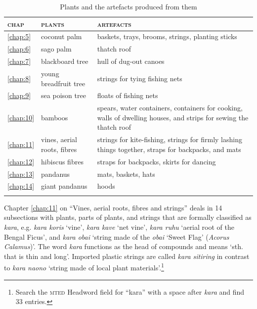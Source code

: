 \documentclass[output=paper]{langscibook}
\begin{document}
\begin{table}[t!]
    \caption{Plants and the artefacts produced from them}\label{tab:plantsandartefacts}
 \begin{tabularx}
{\textwidth}{llQ}

    \lsptoprule
        \textsc{chap}&\textsc{plants}&\textsc{artefacts}\\
    \midrule
        \ref{chap:5}&coconut palm&baskets, trays, brooms, strings, planting sticks\\
        \ref{chap:6}&sago palm&thatch roof\\
        \ref{chap:7}&blackboard tree&hull of dug-out canoes\\
        \ref{chap:8}&young breadfruit tree&strings for tying fishing nets\\
        \ref{chap:9}&sea poison tree&floats of fishing nets\\
        \ref{chap:10}&bamboos&spears, water containers, containers for cooking, walls of dwelling houses, and strips for sewing the thatch roof\\
        \ref{chap:11}&vines, aerial roots, fibres&strings for kite-fishing, strings for firmly lashing things together,  straps for backpacks, and mats\\
        \ref{chap:12}&hibiscus fibres&straps for backpacks, skirts for dancing\\
        \ref{chap:13}&pandanus&mats, baskets, hats\\
        \ref{chap:14}&giant pandanus&hoods\\
    \lspbottomrule
    \end{tabularx}
    \end{table}


Chapter \ref{chap:11} on ``Vines, aerial roots, fibres and strings'' deals in 14 subsections with plants, parts of plants, and strings that are formally classified as \textit{kara}, e.g. \textit{kara koris} `vine', \textit{kara kave} `net vine', \textit{kara ruhu} `aerial root of the Bengal Ficus', and \textit{kara obai} `string made of the \textit{obai} `Sweet Flag' (\textit{Acorus Calamus})'. The word \textit{kara} functions as the head of compounds and means `sth. that is thin and long'. Imported plastic strings are called \textit{kara sitiring} in contrast to \textit{kara naono} `string made of local plant materials'.\footnote{Search the \textsc{mted} Headword field for ``kara'' with a space after \textit{kara} and find 33 entries.}
\end{document}
